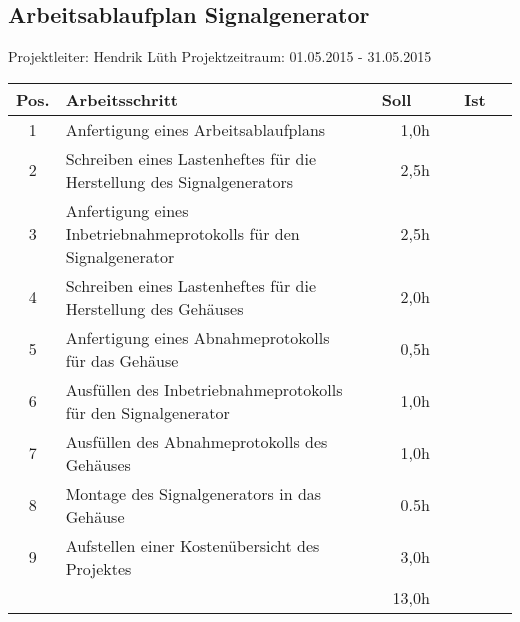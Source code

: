 \begin{center}
\section*{Arbeitsablaufplan Signalgenerator}
Projektleiter: Hendrik Lüth \qquad Projektzeitraum: 01.05.2015 - 31.05.2015
\medskip

\begin{tabular}{lp{15cm}|r|r|}
\hline
\multicolumn{1}{|c|}{Pos.} & Arbeitsschritt & ~~Soll~~ & ~~Ist~~ \\ \hline
\multicolumn{1}{|c|}{1} & Anfertigung eines Arbeitsablaufplans & 1,0h &  \\ \hline
\multicolumn{1}{|c|}{2} & Schreiben eines Lastenheftes für die Herstellung des Signalgenerators & 2,5h &  \\ \hline
\multicolumn{1}{|c|}{3} & Anfertigung eines Inbetriebnahmeprotokolls für den Signalgenerator & 2,5h &  \\ \hline
\multicolumn{1}{|c|}{4} & Schreiben eines Lastenheftes für die Herstellung des Gehäuses & 2,0h &  \\ \hline
\multicolumn{1}{|c|}{5} & Anfertigung eines Abnahmeprotokolls für das Gehäuse & 0,5h &  \\ \hline
\multicolumn{1}{|c|}{6} & Ausfüllen des Inbetriebnahmeprotokolls für den Signalgenerator & 1,0h &  \\ \hline
\multicolumn{1}{|c|}{7} & Ausfüllen des Abnahmeprotokolls des Gehäuses & 1,0h &  \\ \hline
\multicolumn{1}{|c|}{8} & Montage des Signalgenerators in das Gehäuse & 0.5h &  \\ \hline
\multicolumn{1}{|c|}{9} & Aufstellen einer Kostenübersicht des Projektes & 3,0h &  \\ \hline
                       &  & 13,0h &  \\ \cline{3-4} 
\end{tabular}
 
\end{center}